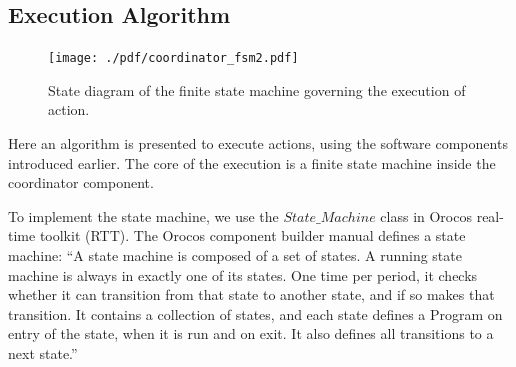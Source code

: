 \subsection{Execution Algorithm}
\label{sec:execution_algorithm}
\begin{figure}
      \centering
      \texttt{[image: ./pdf/coordinator\_fsm2.pdf]}
      \caption{ State diagram of the finite state machine governing the execution of action.
}
      \label{fig:coordinator_fsm}
\end{figure}
Here an algorithm is presented to execute actions, using the software components introduced earlier.
The core of the execution is a finite state machine inside the coordinator component.

To implement the state machine, we use the $State\_Machine$ class in Orocos real-time toolkit (RTT).
The Orocos component builder manual defines a state machine:
``A state machine is composed of a set of states. A running state machine is always in exactly one of its states.
One time per period, it checks whether it can transition from that state to another state, and if so makes that transition.
It contains a collection of states, and each state defines a Program on entry of the state, when it is run and on exit.
It also defines all transitions to a next state.''

